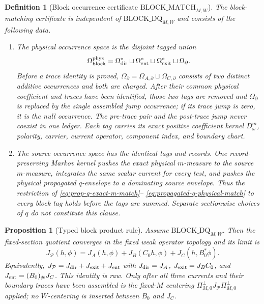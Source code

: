 \documentclass[11pt]{article}
\newtheorem{proposition}[theorem]{Proposition}
\newtheorem{definition}[theorem]{Definition}
\begin{document}
\begin{definition}[Block occurrence certificate
$\mathrm{BLOCK\_MATCH}_{M,W}$]
\label{def:fixed-section-block-match-certificate}
The block-matching certificate is independent of
$\mathrm{BLOCK\_DQ}_{M,W}$ and consists of the following data.
\begin{enumerate}[label=\textup{(BM\arabic*)}]
\item The physical occurrence space is the disjoint tagged union
      \begin{equation}
      \label{eq:fixed-section-block-occurrence-tags}
       \Omega_{\rm block}^{\rm phys}
       =\Omega_{\rm dir}^{\circ}\sqcup\Omega_{\rm ent}^{\circ}
        \sqcup\Omega_{\rm exit}^{\circ}\sqcup\Omega_{\partial}.
      \end{equation}
      Before a trace identity is proved,
      $\Omega_{\partial}=\Omega_{A,\partial}\sqcup
      \Omega_{C,\partial}$ consists of two distinct additive occurrences and
      both are charged.  After their common physical coefficient and traces
      have been identified, those two tags are removed and
      $\Omega_{\partial}$ is replaced by the single assembled jump
      occurrence; if its trace jump is zero, it is the null occurrence.
      The pre-trace pair and the post-trace jump never coexist in one ledger.
      Each tag carries
      its exact positive coefficient kernel $D_\omega^m$, polarity, carrier,
      current operator, component index, and boundary chart.
\item The source occurrence space has the identical tags and records.  One
      record-preserving Markov kernel pushes the exact physical $m$-measure
      to the source $m$-measure, integrates the same scalar current for every
      test, and pushes the physical propagated $q$-envelope to a dominating
      source envelope.  Thus the restriction of
      \eqref{eq:prop-q-exact-m-match}--
      \eqref{eq:propagated-q-physical-match} to every block tag holds before
      the tags are summed.  Separate sectionwise choices of $q$ do not
      constitute this clause.
\end{enumerate}
\end{definition}

\begin{proposition}[Typed block product rule]
\label{prop:fixed-section-typed-block-DQ}
Assume $\mathrm{BLOCK\_DQ}_{M,W}$.  Then the fixed-section quotient converges
in the fixed weak operator topology and its limit is
\begin{equation}
\label{eq:fixed-section-block-DQ-limit-product-rule}
 J_{\mathcal P}(h,\phi)
 =J_A(h,\phi)+J_B(C_0h,\phi)+J_C(h,B_0^*\phi).
\end{equation}
Equivalently,
$J_{\mathcal P}=J_{\rm dir}+J_{\rm exit}+J_{\rm ent}$ with
$J_{\rm dir}=J_A$, $J_{\rm exit}=J_BC_0$, and
$J_{\rm ent}=(B_0)_\#J_C$.  This identity is raw.  Only after all three
currents and their boundary traces have been assembled is the fixed-$M$
centering $\Pi_{M,0}^{\perp}J_{\mathcal P}\Pi_{M,0}^{\perp}$ applied; no
$W$-centering is inserted between $B_0$ and $J_C$.
\end{proposition}
\end{document}
